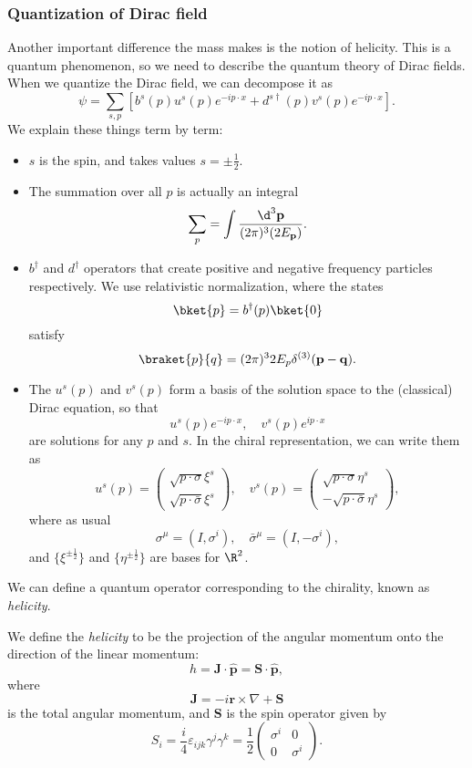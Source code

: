 \documentclass[a4paper]{article}
\begin{document}
\subsubsection*{Quantization of Dirac field}
Another important difference the mass makes is the notion of helicity. This is a quantum phenomenon, so we need to describe the quantum theory of Dirac fields. When we quantize the Dirac field, we can decompose it as
\[
  \psi = \sum_{s, p}\left[b^s (p) u^s(p) e^{-ip\cdot x} + d^{s\dagger}(p) v^s(p) e^{-ip\cdot x}\right].
\]
We explain these things term by term:
\begin{itemize}
  \item $s$ is the spin, and takes values $s = \pm \frac{1}{2}$.
  \item The summation over all $p$ is actually an integral
    \[
      \sum_p = \int \frac{\d^3 \mathbf{p}}{(2\pi)^3 (2E_\mathbf{p})}.
    \]
  \item $b^\dagger$ and $d^\dagger$ operators that create positive and negative frequency particles respectively. We use relativistic normalization, where the states
    \[
      \bket{p} = b^\dagger(p) \bket{0}
    \]
    satisfy
    \[
      \braket{p}{q} = (2\pi)^3 2E_p \delta^{(3)} (\mathbf{p} - \mathbf{q}).
    \]
  \item The $u^s(p)$ and $v^s(p)$ form a basis of the solution space to the (classical) Dirac equation, so that
    \[
      u^s(p) e^{-ip\cdot x},\quad v^s(p) e^{ip\cdot x}
    \]
    are solutions for any $p$ and $s$. In the chiral representation, we can write them as
    \[
      u^s(p) =
      \begin{pmatrix}
        \sqrt{p \cdot \sigma} \xi^s\\
        \sqrt{p \cdot \bar\sigma} \xi^s
      \end{pmatrix},\quad
      v^s(p) =
      \begin{pmatrix}
        \sqrt{p \cdot \sigma} \eta^s\\
        -\sqrt{p \cdot \bar\sigma} \eta^s
      \end{pmatrix},
    \]
    where as usual
    \[
      \sigma^\mu = (I, \sigma^i),\quad \bar{\sigma}^\mu = (I, - \sigma^i),
    \]
    and $\{\xi^{\pm \frac{1}{2}}\}$ and $\{\eta^{\pm \frac{1}{2}}\}$ are bases for $\R^2$.
\end{itemize}

We can define a quantum operator corresponding to the chirality, known as \emph{helicity}.
\begin{defi}[Helicity]
  We define the \emph{helicity} to be the projection of the angular momentum onto the direction of the linear momentum:
  \[
    h = \mathbf{J} \cdot \hat{\mathbf{p}} = \mathbf{S} \cdot \hat{\mathbf{p}},
  \]
  where
  \[
    \mathbf{J} = -i \mathbf{r} \times \nabla + \mathbf{S}
  \]
  is the total angular momentum, and $\mathbf{S}$ is the spin operator given by
  \[
    S_i = \frac{i}{4} \varepsilon_{ijk} \gamma^j \gamma^k = \frac{1}{2}
    \begin{pmatrix}
      \sigma^i & 0\\
      0 & \sigma^i
    \end{pmatrix}.
  \]
\end{defi}
\end{document}
